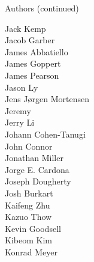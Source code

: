 \begin{frame}{Authors (continued)}
\begin{multicols}{5}
Jack Kemp\\
Jacob Garber\\
James Abbatiello\\
James Goppert\\
James Pearson\\
Jason Ly\\
Jens Jørgen Mortensen\\
Jeremy\\
Jerry Li\\
Johann Cohen-Tanugi\\
John Connor\\
Jonathan Miller\\
Jorge E. Cardona\\
Joseph Dougherty\\
Josh Burkart\\
Kaifeng Zhu\\
Kazuo Thow\\
Kevin Goodsell\\
Kibeom Kim\\
Konrad Meyer\\
\end{multicols}
\end{frame}
